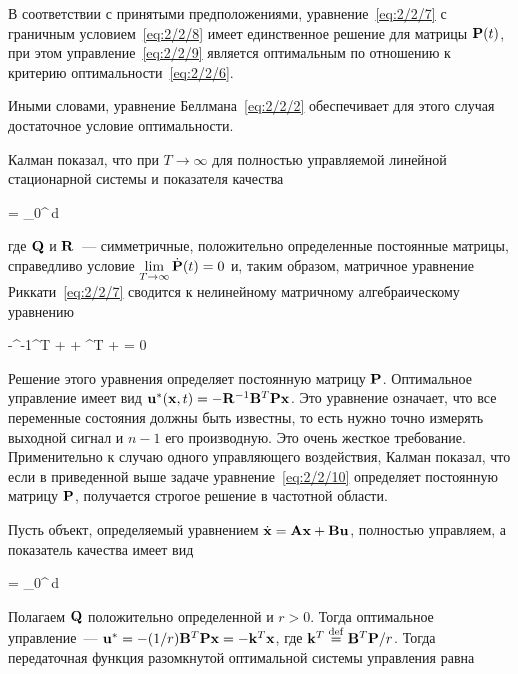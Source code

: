     В соответствии с принятыми предположениями, уравнение~\ref{eq:2/2/7} с граничным условием~\ref{eq:2/2/8} имеет единственное решение для матрицы $\mathbf{P}(t)$, при этом управление~\ref{eq:2/2/9} является оптимальным по отношению к критерию оптимальности~\vref{eq:2/2/6}.
\eteo

Иными словами, уравнение Беллмана~\vref{eq:2/2/2} обеспечивает для этого случая достаточное условие оптимальности.

\br

Калман\cite{KALMAN1} показал, что при $T \to \infty$ для полностью управляемой линейной стационарной системы и показателя качества

\beqn
    \funcF =  \int\limits_0^\infty {}\,d\tau \text{,}
\eeqn

где $\mathbf{Q}$ и $\mathbf{R}$~--- симметричные, положительно определенные постоянные матрицы, справедливо условие $\lim\limits_{T \to \infty}\dot{\mathbf{P}}(t) = 0$ и, таким образом, матричное уравнение Риккати~\ref{eq:2/2/7} сводится к нелинейному матричному алгебраическому уравнению

    -^{-1}^T +  + ^T +  = 0 
\eeq

Решение этого уравнения определяет постоянную матрицу $\mathbf{P}$. Оптимальное управление имеет вид ${\mathbf{u}^{*}}(\mathbf{x}, t) = -\mathbf{R}^{-1}\mathbf{B}^T\mathbf{P} \mathbf{x}$. Это уравнение означает, что все переменные состояния должны быть известны, то есть нужно точно измерять выходной сигнал и $n-1$ его производную. Это очень жесткое требование. Применительно к случаю одного управляющего воздействия, Калман\cite{KALMAN2} показал, что если в приведенной выше задаче уравнение~\ref{eq:2/2/10} определяет постоянную матрицу $\mathbf{P}$, получается строгое решение в частотной области.

\br

Пусть объект, определяемый уравнением $\dot{\mathbf{x}} = \mathbf{A}\mathbf{x} + \mathbf{B} \mathbf{u}$, полностью управляем, а показатель качества имеет вид

    \funcF =  \int\limits_0^\infty {}\,d\tau {}
\eeq

Полагаем $\mathbf{Q}$ положительно определенной и $r > 0$. Тогда оптимальное управление~--- ${\mathbf{u}^{*}} = -(1/r) \mathbf{B}^T\mathbf{P} \mathbf{x} = -\mathbf{k}^T\mathbf{x}$, где $\mathbf{k}^T \stackrel{ \mathrm{def} }{=} \mathbf{B}^T\mathbf{P} / r$. Тогда передаточная функция разомкнутой оптимальной системы управления равна\cite{XU}

